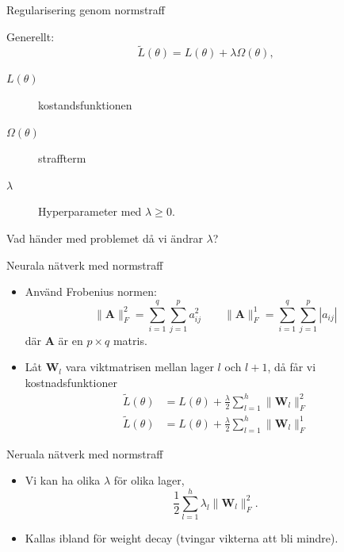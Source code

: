 \documentclass[10pt,english]{beamer}
\begin{document}
\begin{frame}{Regularisering genom normstraff}
    
    Generellt:
    \begin{equation*}
        \tilde{L}(\theta) = L(\theta) + \lambda \Omega(\theta),
    \end{equation*}
    \begin{description}
        \item[$L(\theta)$] kostandsfunktionen
        \item[$\Omega(\theta)$] straffterm
        \item[$\lambda$] Hyperparameter med $\lambda \geq 0$.   
    \end{description}

    Vad händer med problemet då vi ändrar $\lambda$?

\end{frame}

\begin{frame}{Neurala nätverk med normstraff}
    \begin{itemize}
        \item Använd Frobenius normen:
        \begin{equation*}
            \|\mathbf{A}\|_{F}^2 = \sum_{i=1}^{q}\sum_{j=1}^{p} a_{ij}^2 \qquad \|\mathbf{A}\|^1_{F} = \sum_{i=1}^{q}\sum_{j=1}^{p} |a_{ij}|
        \end{equation*}
        där $\mathbf{A}$ är en $p \times q$ matris.
        \item Låt $\mathbf{W}_l$ vara viktmatrisen mellan lager $l$ och $l+1$, då får vi kostnadsfunktioner
        \begin{align*}
            \tilde{L}(\theta) &= L(\theta) + \frac{\lambda}{2} \sum_{l=1}^{h} \| \mathbf{W}_l \|_{F}^{2} \\
            \tilde{L}(\theta) &= L(\theta) + \frac{\lambda}{2} \sum_{l=1}^{h} \| \mathbf{W}_l \|_{F}^{1}
        \end{align*}
    \end{itemize}
\end{frame}

\begin{frame}{Neruala nätverk med normstraff}
    \begin{itemize}
        \item Vi kan ha olika $\lambda$ för olika lager,
        \begin{equation*}
            \frac{1}{2} \sum_{l=1}^h \lambda_l \|\mathbf{W}_l\|^2_F.
        \end{equation*}
        \item Kallas ibland för weight decay (tvingar vikterna att bli mindre).
    \end{itemize}
\end{frame}
\end{document}
